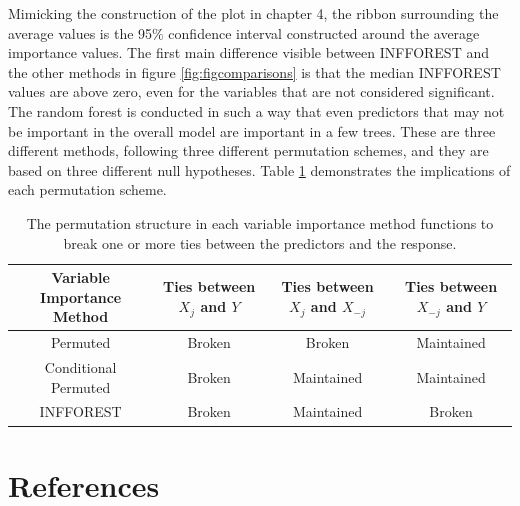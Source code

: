\documentclass[12pt,twoside]{reedthesis}
\begin{document}
  Mimicking the construction of the plot in chapter 4, the ribbon
  surrounding the average values is the 95\% confidence interval
  constructed around the average importance values. The first main
  difference visible between INFFOREST and the other methods in figure
  \ref{fig:figcomparisons} is that the median INFFOREST values are above
  zero, even for the variables that are not considered significant. The
  random forest is conducted in such a way that even predictors that may
  not be important in the overall model are important in a few trees.
  These are three different methods, following three different permutation
  schemes, and they are based on three different null hypotheses. Table
  \ref{tab:tabVIties} demonstrates the implications of each permutation
  scheme.
  
  \begin{table}[H]
  \begin{tabular}{|c|c|c|c|}
  \hline
  Variable Importance Method & Ties between $X_j$ and $Y$ & Ties between $X_j$ and $X_{-j}$ & Ties between $X_{-j}$ and $Y$ \\ \hline
  Permuted                   & Broken                     & Broken                          & Maintained                    \\ \hline
  Conditional Permuted       & Broken                     & Maintained                      & Maintained                    \\ \hline
  INFFOREST                  & Broken                     & Maintained                      & Broken                        \\ \hline
  \end{tabular}
  \caption{The permutation structure in each variable importance method functions to break one or more ties between the predictors and the response.}
  \label{tab:tabVIties}
  \end{table}
  
  \backmatter
  
  \chapter{References}\label{references}
  
  \noindent
  
  \setlength{\parindent}{-0.20in} \setlength{\leftskip}{0.20in}
  \setlength{\parskip}{8pt}


\end{document}
